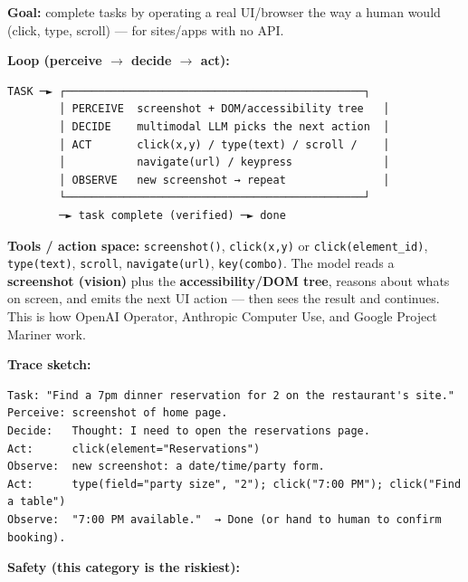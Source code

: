 \documentclass[11pt]{article}
\begin{document}
\textbf{Goal:} complete tasks by operating a real UI/browser the way a human would (click, type, scroll) --- for sites/apps with no API.

\textbf{Loop (perceive \(\rightarrow\) decide \(\rightarrow\) act):}

\setcodelang{}

\begin{verbatim}
TASK ─► ┌──────────────────────────────────────────────┐
        │ PERCEIVE  screenshot + DOM/accessibility tree   │
        │ DECIDE    multimodal LLM picks the next action  │
        │ ACT       click(x,y) / type(text) / scroll /    │
        │           navigate(url) / keypress              │
        │ OBSERVE   new screenshot → repeat               │
        └──────────────────────────────────────────────┘
        ─► task complete (verified) ─► done
\end{verbatim}

\textbf{Tools / action space:} \texttt{screenshot()}, \texttt{click(x,y)} or \texttt{click(element\_id)}, \texttt{type(text)}, \texttt{scroll}, \texttt{navigate(url)}, \texttt{key(combo)}. The model reads a \textbf{screenshot (vision)} plus the \textbf{accessibility/DOM tree}, reasons about what\textquotesingle s on screen, and emits the next UI action --- then sees the result and continues. This is how OpenAI Operator, Anthropic Computer Use, and Google Project Mariner work.

\textbf{Trace sketch:}

\setcodelang{}

\begin{verbatim}
Task: "Find a 7pm dinner reservation for 2 on the restaurant's site."
Perceive: screenshot of home page.
Decide:   Thought: I need to open the reservations page.
Act:      click(element="Reservations")
Observe:  new screenshot: a date/time/party form.
Act:      type(field="party size", "2"); click("7:00 PM"); click("Find a table")
Observe:  "7:00 PM available."  → Done (or hand to human to confirm booking).
\end{verbatim}

\textbf{Safety (this category is the riskiest):}
\end{document}
